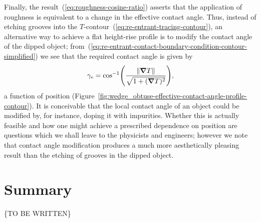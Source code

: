 \begin{figure}
\end{figure}

Finally, the result~(\ref{eq:roughness-cosine-ratio})
asserts that the application of roughness
is equivalent to a change in the effective contact angle.
Thus, instead of etching grooves
into the $T$-contour~(\ref{eq:re-entrant-tracing-contour}),
an alternative way to achieve a flat height-rise profile
is to modify the contact angle of the dipped object;
from~(\ref{eq:re-entrant-contact-boundary-condition-contour-simplified})
we see that the required contact angle is given by
\begin{equation}
  \gamma_\eff =
    \cos^{-1} \roundbr*{\frac{\norm{\del T}}{\sqrt{1 + (\del T)^2}}},
  \label{eq:effective-contact-angle-required}
\end{equation}
a function of position
(Figure~\ref{fig:wedge_obtuse-effective-contact-angle-profile-contour}).
It is conceivable that
the local contact angle of an object could be modified
by, for instance, doping it with impurities.
Whether this is actually feasible
and how one might achieve a prescribed dependence on position
are questions which we shall leave to the physicists and engineers;
however we note that contact angle modification
produces a much more aesthetically pleasing result
than the etching of grooves in the dipped object.

\begin{figure}
\end{figure}

\section{Summary}
\label{sec:re-entrant.summary}

\{TO BE WRITTEN\}
